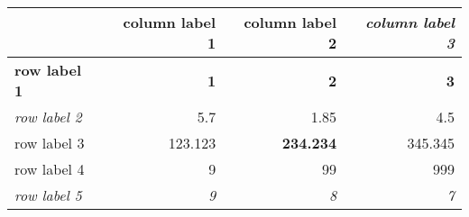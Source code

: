 \begin{tabular}{lrrr} 
\toprule 
  	 & 	 \textbf{column label 1} 	 & 	 column label 2 	 & 	 \textit{column label 3} \\ 
\midrule 
\textbf{row label 1} 	 & 	 \textbf{1} 	 & 	 \textbf{2} 	 & 	 \textbf{3} \\ 
\textit{row label 2} 	 & 	 5.7 	 & 	 1.85 	 & 	 4.5 \\ 
row label 3 	 & 	 123.123 	 & 	 \textbf{234.234} 	 & 	 345.345 \\ 
row label 4 	 & 	 9 	 & 	 99 	 & 	 999 \\ 
\textit{row label 5} 	 & 	 \textit{9} 	 & 	 \textit{8} 	 & 	 \textit{7} \\ 
\bottomrule 
\end{tabular}